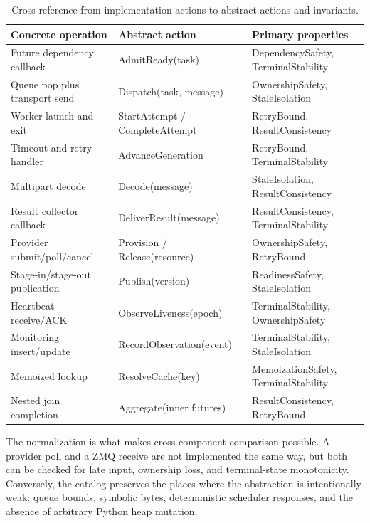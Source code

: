 \documentclass[11pt,a4paper]{article}
\newenvironment{tabularx}[2]{\begin{tabular}{#2}}{\end{tabular}}
\renewcommand{\baselinestretch}{1.0}
\begin{document}
\begingroup
\renewcommand{\baselinestretch}{0.82}\normalsize
\begin{table}[h]
\centering
\caption{Cross-reference from implementation actions to abstract actions and invariants.}
\label{tab:action-map}
\begin{tabularx}{\textwidth}{>{\raggedright\arraybackslash}p{0.19\textwidth} X X}
\toprule
Concrete operation & Abstract action & Primary properties \\
\midrule
Future dependency callback & AdmitReady(task) & DependencySafety, TerminalStability \\
Queue pop plus transport send & Dispatch(task, message) & OwnershipSafety, StaleIsolation \\
Worker launch and exit & StartAttempt / CompleteAttempt & RetryBound, ResultConsistency \\
Timeout and retry handler & AdvanceGeneration & RetryBound, TerminalStability \\
Multipart decode & Decode(message) & StaleIsolation, ResultConsistency \\
Result collector callback & DeliverResult(message) & ResultConsistency, TerminalStability \\
Provider submit/poll/cancel & Provision / Release(resource) & OwnershipSafety, RetryBound \\
Stage-in/stage-out publication & Publish(version) & ReadinessSafety, StaleIsolation \\
Heartbeat receive/ACK & ObserveLiveness(epoch) & TerminalStability, OwnershipSafety \\
Monitoring insert/update & RecordObservation(event) & TerminalStability, StaleIsolation \\
Memoized lookup & ResolveCache(key) & MemoizationSafety, TerminalStability \\
Nested join completion & Aggregate(inner futures) & ResultConsistency, RetryBound \\
\bottomrule
\end{tabularx}
\end{table}
\endgroup

The normalization is what makes cross-component comparison possible. A provider poll and a ZMQ
receive are not implemented the same way, but both can be checked for late input, ownership loss,
and terminal-state monotonicity. Conversely, the catalog preserves the places where the abstraction
is intentionally weak: queue bounds, symbolic bytes, deterministic scheduler responses, and the
absence of arbitrary Python heap mutation.
\end{document}
